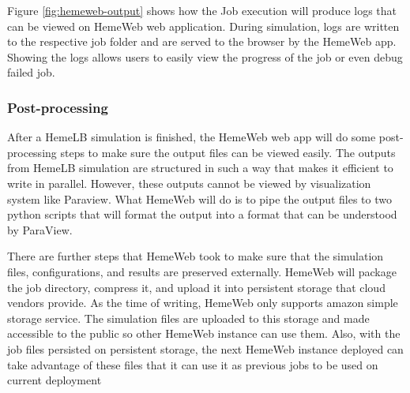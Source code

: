 \vspace{1cm}

\noindent%
\begin{minipage}{\linewidth}%
\label{fig:hemeweb-output}%
\end{minipage}

\vspace{1cm}

Figure \ref{fig:hemeweb-output} shows how the Job execution will produce logs that can be viewed on HemeWeb web application. During simulation, logs are written to the respective job folder and are served to the browser by the HemeWeb app. Showing the logs allows users to easily view the progress of the job or even debug failed job.


\subsubsection{Post-processing}

After a HemeLB simulation is finished, the HemeWeb web app will do some post-processing steps to make sure the output files can be viewed easily. The outputs from HemeLB simulation are structured in such a way that makes it efficient to write in parallel. However, these outputs cannot be viewed by visualization system like Paraview. What HemeWeb will do is to pipe the output files to two python scripts that will format the output into a format that can be understood by ParaView.


There are further steps that HemeWeb took to make sure that the simulation files, configurations, and results are preserved externally. HemeWeb will package the job directory, compress it, and upload it into persistent storage that cloud vendors provide. As the time of writing, HemeWeb only supports amazon simple storage service. The simulation files are uploaded to this storage and made accessible to the public so other HemeWeb instance can use them. Also, with the job files persisted on persistent storage, the next HemeWeb instance deployed can take advantage of these files that it can use it as previous jobs to be used on current deployment






